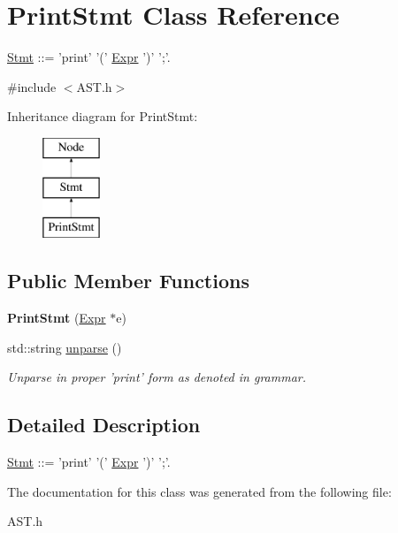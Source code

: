 \hypertarget{classPrintStmt}{\section{Print\-Stmt Class Reference}
\label{classPrintStmt}
}


\hyperlink{classStmt}{Stmt} \-:\-:= 'print' '(' \hyperlink{classExpr}{Expr} ')' ';'.  




{\ttfamily \#include $<$A\-S\-T.\-h$>$}

Inheritance diagram for Print\-Stmt\-:\begin{figure}[H]
\begin{center}
\leavevmode
\includegraphics[height=3.000000cm]{classPrintStmt}
\end{center}
\end{figure}
\subsection*{Public Member Functions}
\begin{DoxyCompactItemize}
\item 
\hypertarget{classPrintStmt_a58af5b7c49ef63dfa35950ac253f81ca}{{\bfseries Print\-Stmt} (\hyperlink{classExpr}{Expr} $\ast$e)}\label{classPrintStmt_a58af5b7c49ef63dfa35950ac253f81ca}

\item 
\hypertarget{classPrintStmt_aa3c9ad246b75bd45a48e563500b5109f}{std\-::string \hyperlink{classPrintStmt_aa3c9ad246b75bd45a48e563500b5109f}{unparse} ()}\label{classPrintStmt_aa3c9ad246b75bd45a48e563500b5109f}

\begin{DoxyCompactList}\small\item\em Unparse in proper 'print' form as denoted in grammar. \end{DoxyCompactList}\end{DoxyCompactItemize}


\subsection{Detailed Description}
\hyperlink{classStmt}{Stmt} \-:\-:= 'print' '(' \hyperlink{classExpr}{Expr} ')' ';'. 

The documentation for this class was generated from the following file\-:\begin{DoxyCompactItemize}
\item 
A\-S\-T.\-h\end{DoxyCompactItemize}
